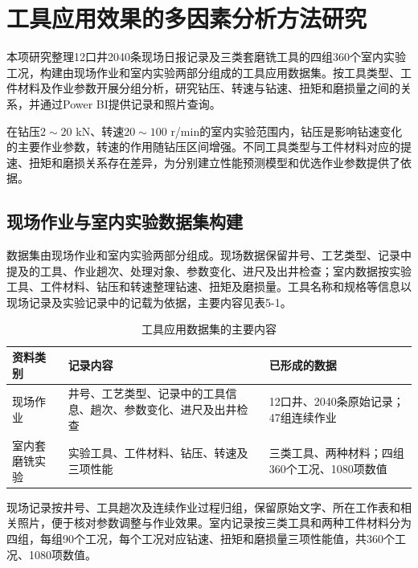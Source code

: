\chapter{工具应用效果的多因素分析方法研究}
\label{chap:r46-4}

本项研究整理12口井2040条现场日报记录及三类套磨铣工具的四组360个室内实验工况，构建由现场作业和室内实验两部分组成的工具应用数据集。按工具类型、工件材料及作业参数开展分组分析，研究钻压、转速与钻速、扭矩和磨损量之间的关系，并通过Power BI提供记录和照片查询。

在钻压$2\sim20$ kN、转速$20\sim100$ r/min的室内实验范围内，钻压是影响钻速变化的主要作业参数，转速的作用随钻压区间增强。不同工具类型与工件材料对应的提速、扭矩和磨损关系存在差异，为分别建立性能预测模型和优选作业参数提供了依据。

\section{现场作业与室内实验数据集构建}
\label{sec:r46-4.1}

数据集由现场作业和室内实验两部分组成。现场数据保留井号、工艺类型、记录中提及的工具、作业趟次、处理对象、参数变化、进尺及出井检查；室内数据按实验工具、工件材料、钻压和转速整理钻速、扭矩及磨损量。工具名称和规格等信息以现场记录及实验记录中的记载为依据，主要内容见表5-1。

\begin{table}[H]
\centering
{}
\fontsize{12}{15}\selectfont
\setlength{\tabcolsep}{3pt}
\renewcommand{\arraystretch}{1.5}
\caption{工具应用数据集的主要内容}\label{tab:r46-4-1}
\begin{tabular}{>{\centering\arraybackslash}m{0.204792\dimexpr\linewidth-6\tabcolsep-4\arrayrulewidth\relax}>{\centering\arraybackslash}m{0.433422\dimexpr\linewidth-6\tabcolsep-4\arrayrulewidth\relax}>{\centering\arraybackslash}m{0.361787\dimexpr\linewidth-6\tabcolsep-4\arrayrulewidth\relax}}
\toprule
 资料类别 & 记录内容 & 已形成的数据 \\ \midrule
现场作业 & 井号、工艺类型、记录中的工具信息、趟次、参数变化、进尺及出井检查 & 12口井、2040条原始记录；47组连续作业 \\ 
室内套磨铣实验 & 实验工具、工件材料、钻压、转速及三项性能 & 三类工具、两种材料；四组360个工况、1080项数值 \\ \bottomrule
\end{tabular}
\end{table}

现场记录按井号、工具趟次及连续作业过程归组，保留原始文字、所在工作表和相关照片，便于核对参数调整与作业效果。室内记录按三类工具和两种工件材料分为四组，每组90个工况，每个工况对应钻速、扭矩和磨损量三项性能值，共360个工况、1080项数值。

